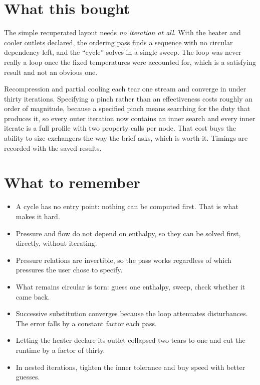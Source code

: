 \documentclass[11pt,a4paper]{report}
\begin{document}
\section{What this bought}
\label{sec:explicit}

The simple recuperated layout needs \emph{no iteration at all}. With the
heater and cooler outlets declared, the ordering pass finds a sequence with
no circular dependency left, and the ``cycle'' solves in a single sweep. The
loop was never really a loop once the fixed temperatures were accounted for,
which is a satisfying result and not an obvious one.

Recompression and partial cooling each tear one stream and converge in under
thirty iterations. Specifying a pinch rather than an effectiveness costs
roughly an order of magnitude, because a specified pinch means searching for
the duty that produces it, so every outer iteration now contains an inner
search and every inner iterate is a full profile with two property calls per
node. That cost buys the ability to size exchangers the way the brief asks,
which is worth it. Timings are recorded with the saved results.

\section{What to remember}

\begin{itemize}\itemsep2pt
\item A cycle has no entry point: nothing can be computed first. That is
      what makes it hard.
\item Pressure and flow do not depend on enthalpy, so they can be solved
      first, directly, without iterating.
\item Pressure relations are invertible, so the pass works regardless of
      which pressures the user chose to specify.
\item What remains circular is torn: guess one enthalpy, sweep, check
      whether it came back.
\item Successive substitution converges because the loop attenuates
      disturbances. The error falls by a constant factor each pass.
\item Letting the heater declare its outlet collapsed two tears to one and
      cut the runtime by a factor of thirty.
\item In nested iterations, tighten the inner tolerance and buy speed with
      better guesses.
\end{itemize}
\end{document}
